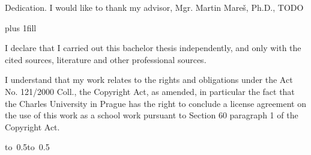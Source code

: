 \documentclass[12pt,a4paper]{report}
\let\openright=\clearpage
\begin{document}
\newpage



\openright

\noindent
Dedication.
I would like to thank my advisor, Mgr. Martin Mareš, Ph.D., TODO

\newpage


\vglue 0pt plus 1fill

\noindent
I declare that I carried out this bachelor thesis independently, and only with the cited
sources, literature and other professional sources.

\medskip\noindent
I understand that my work relates to the rights and obligations under the Act No.
121/2000 Coll., the Copyright Act, as amended, in particular the fact that the Charles
University in Prague has the right to conclude a license agreement on the use of this
work as a school work pursuant to Section 60 paragraph 1 of the Copyright Act.

\vspace{10mm}

\hbox{\hbox to 0.5\hbox to 0.5}

\vspace{20mm}
\newpage

\end{document}
